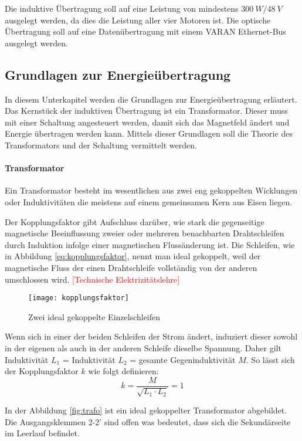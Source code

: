Die induktive Übertragung soll auf eine Leistung von mindestens $\SI{300}{W}/\SI{48}{V}$ ausgelegt werden, da dies die Leistung aller vier Motoren ist. Die optische Übertragung soll auf eine Datenübertragung mit einem VARAN Ethernet-Bus ausgelegt werden.

\subsection{Grundlagen zur Energieübertragung}
In diesem Unterkapitel werden die Grundlagen zur Energieübertragung erläutert. Das Kernstück der induktiven Übertragung ist ein Transformator. Dieser muss mit einer Schaltung angesteuert werden, damit sich das Magnetfeld ändert und Energie übertragen werden kann. Mittels dieser Grundlagen soll die Theorie des Transformators und der Schaltung vermittelt werden.

\paragraph{Transformator}
Ein Transformator besteht im wesentlichen aus zwei eng gekoppelten Wicklungen oder Induktivitäten die meistens auf einem gemeinsamen Kern aus Eisen liegen. 

Der Kopplungsfaktor gibt Aufschluss darüber, wie stark die gegenseitige magnetische Beeinflussung zweier oder mehreren benachbarten Drahtschleifen durch Induktion infolge einer magnetischen Flussänderung ist. Die Schleifen, wie in Abbildung \ref{eq:kopplungsfaktor}, nennt man ideal gekoppelt, weil der magnetische Fluss der einen Drahtschleife vollständig von der anderen umschlossen wird. \textcolor{red}{[Technische Elektrizitätslehre]}

\begin{figure}[H]
	\centering
	\texttt{[image: kopplungsfaktor]}
	\caption{Zwei ideal gekoppelte Einzelschleifen}\label{fig:kopplungsfaktor}
\end{figure}

Wenn sich in einer der beiden Schleifen der Strom ändert, induziert dieser sowohl in der eigenen als auch in der anderen Schleife dieselbe Spannung. Daher gilt Induktivität $ L_{1}$ = Induktivität $L_{2}$ = gesamte Gegeninduktivität $M$.
So lässt sich der Kopplungsfaktor $ k $ wie folgt definieren:
\begin{equation}
k=\frac{M}{\sqrt{L_{1}\cdot L_{2}}} = 1
\label{eq:kopplungsfaktor}
\end{equation}

In der Abbildung \ref{fig:trafo} ist ein ideal gekoppelter Transformator abgebildet. Die Ausgangsklemmen 2-2' sind offen was bedeutet, dass sich die Sekundärseite im Leerlauf befindet.
 
